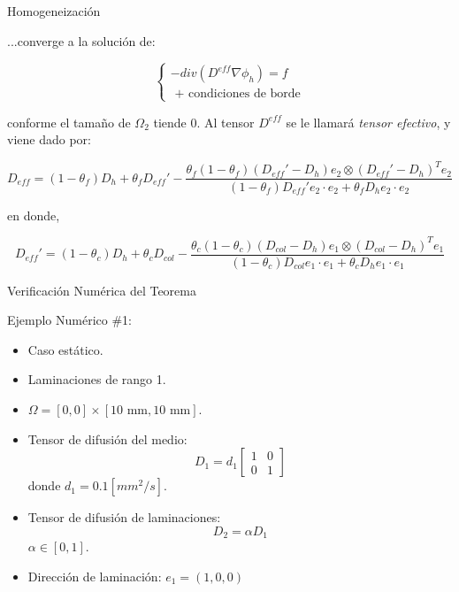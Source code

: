 \documentclass[11pt,spanish]{beamer}
\begin{document}
\begin{frame}{Homogeneización}

...converge a la solución de:

\begin{equation}
\left\lbrace
\begin{array}{c} 
-div(D^{eff} \nabla \phi_h )= f \label{difusion_eff}\\
\text{ + condiciones de borde}
\end{array}
\right.
\end{equation}

conforme el tamaño de $\Omega_2$ tiende 0. Al tensor $D^{eff}$ se le llamará \textsl{tensor efectivo}, y viene dado por:

\begin{equation*}
D_{eff} = 
(1 - \theta_f)D_h + \theta_f D_{eff}' - \frac{\theta_f (1 - \theta_f)(D_{eff}' - D_h)e_2 \otimes (D_{eff}' - D_h)^T e_2}{(1 - \theta_f)D_{eff}' e_2 \cdot e_2 + \theta_f D_h e_2 \cdot e_2 }
\end{equation*}

en donde,

\begin{equation*}
D_{eff}'=
(1 - \theta_c)D_h + \theta_c D_{col} - \frac{\theta_c (1 - \theta_c)(D_{col} - D_{h})e_1 \otimes (D_{col} - D_{h})^T e_1}{(1 - \theta_c)D_{col} e_1 \cdot e_1 + \theta_c D_{h} e_1 \cdot e_1 }
\end{equation*}
\end{frame}

\begin{frame}{Verificación Numérica del Teorema}

Ejemplo Numérico \#1:

\begin{itemize}
\item Caso estático.
\item Laminaciones de rango 1.
\item $\Omega = [0,0]\times[10 \text{ mm}, 10 \text{ mm}]$.
\item Tensor de difusión del medio:
\begin{equation*}
D_1 = d_1 \left[ \begin{array}{cc}
1 & 0 \\
0 & 1
\end{array} \right] 
\end{equation*}
donde  $d_1 = 0.1 [mm^2/s]$.

\item Tensor de difusión de laminaciones:
\begin{equation*}
D_2 = \alpha D_1
\end{equation*}
$\alpha \in [0,1]$.

\item Dirección de laminación: $e_1 = (1,0,0)$
\end{itemize}
\end{frame}
\end{document}

